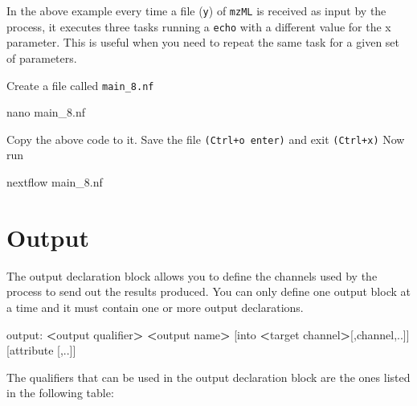 \documentclass[
]{book}
\newenvironment{Shaded}{\begin{snugshade}}{\end{snugshade}}
\newcommand{\ExtensionTok}[1]{#1}
\newcommand{\FunctionTok}[1]{\textcolor[rgb]{0.00,0.00,0.00}{#1}}
\newcommand{\NormalTok}[1]{#1}
\newcommand{\OperatorTok}[1]{\textcolor[rgb]{0.81,0.36,0.00}{\textbf{#1}}}
\begin{document}
In the above example every time a file (\texttt{y}) of \texttt{mzML} is received as input by the process, it executes three tasks running a \texttt{echo} with a different value for the x parameter. This is useful when you need to repeat the same task for a given set of parameters.

Create a file called \texttt{main\_8.nf}

\begin{Shaded}
\begin{Highlighting}[numbers=left,,]
\FunctionTok{nano}\NormalTok{ main\_8.nf}
\end{Highlighting}
\end{Shaded}

Copy the above code to it. Save the file \texttt{(Ctrl+o\ enter)} and exit \texttt{(Ctrl+x)}
Now run

\begin{Shaded}
\begin{Highlighting}[numbers=left,,]
\ExtensionTok{nextflow}\NormalTok{ main\_8.nf}
\end{Highlighting}
\end{Shaded}

\hypertarget{output}{%
\section{Output}\label{output}}

The output declaration block allows you to define the channels used by the process to send out the results produced. You can only define one output block at a time and it must contain one or more output declarations.

\begin{Shaded}
\begin{Highlighting}[numbers=left,,]
\ExtensionTok{output:}
\OperatorTok{\textless{}}\NormalTok{output }\ExtensionTok{qualifier}\OperatorTok{\textgreater{}} \OperatorTok{\textless{}}\NormalTok{output name}\OperatorTok{\textgreater{}}\NormalTok{ [into }\OperatorTok{\textless{}}\NormalTok{target channel}\OperatorTok{\textgreater{}}\NormalTok{[,channel,..]] [attribute [,..]]}
\end{Highlighting}
\end{Shaded}

The qualifiers that can be used in the output declaration block are the ones listed in the following table:
\end{document}
